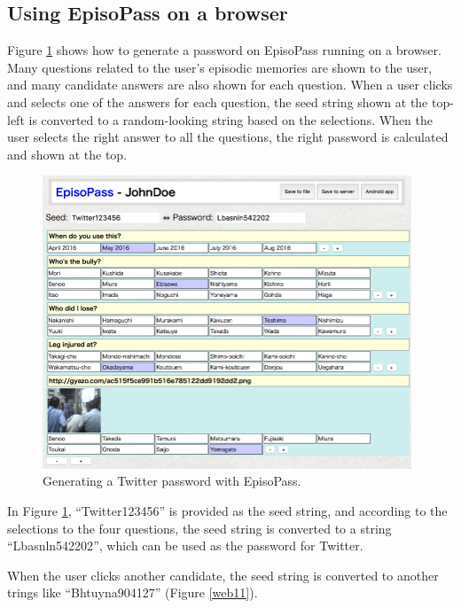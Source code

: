 \documentclass{article}
\begin{document}
\subsection{Using EpisoPass on a browser}

Figure \ref{web1} shows how to generate a password
on EpisoPass running on a browser.
Many questions related to the user's episodic memories are shown to the user,
and many candidate answers are also shown for each question.
When a user clicks and selects one of the answers for each question,
the seed string shown at the top-left is converted to a random-looking string
based on the selections.
When the user selects the right answer to all the questions,
the right password is calculated and shown at the top.


\begin{figure}[t]
\includegraphics[width=110mm,bb=-30 0 803 662]{figures/c1bd6e7f67698c70978f528ccd2339d9.png}
\caption{Generating a Twitter password with EpisoPass.}
\label{web1}
\end{figure}

In Figure \ref{web1},
``\textsf{Twitter123456}'' is provided as the seed string,
and according to the selections to the four questions,
the seed string is converted to a string
``\textsf{Lbasnln542202}'',
which can be used as the password for Twitter.

When the user clicks another candidate,
the seed string is converted to another trings like
``\textsf{Bhtuyna904127}'' (Figure \ref{web11}).
\end{document}

